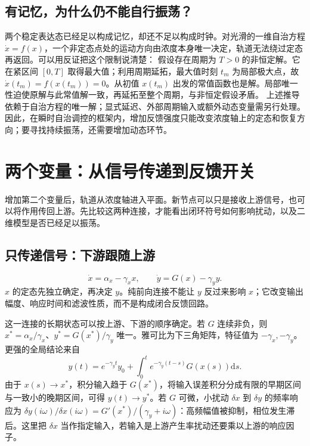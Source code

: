 \documentclass[11pt,a4paper,UTF8,fontset=fandol]{ctexart}
\newcommand{\dd}{\mathrm d}\newcommand{\R}{\mathbb R}\newcommand{\ssv}{\mathrm{ss}}
\begin{document}
\subsection{有记忆，为什么仍不能自行振荡？}
两个稳定表达态已经足以构成记忆，却还不足以构成时钟。对光滑的一维自治方程 $\dot x=f(x)$，一个非定态点处的运动方向由浓度本身唯一决定，轨道无法绕过定态再返回。可以用反证把这个限制说清楚：
假设存在周期为 $T>0$ 的非恒定解。它在紧区间 $[0,T]$ 取得最大值；利用周期延拓，最大值时刻 $t_m$ 为局部极大点，故 $\dot x(t_m)=f(x(t_m))=0$。从初值 $x(t_m)$ 出发的常值函数也是解。局部唯一性迫使原解与此常值解一致，再延拓至整个周期，与非恒定假设矛盾。
上述推导依赖于自治方程的唯一解；显式延迟、外部周期输入或额外动态变量需另行处理。因此，在瞬时自治调控的框架内，增加反馈强度只能改变浓度轴上的定态和恢复方向；要寻找持续振荡，还需要增加动态环节。

\section{两个变量：从信号传递到反馈开关}
增加第二个变量后，轨道从浓度轴进入平面。新节点可以只是接收上游信号，也可以将作用传回上游。先比较这两种连接，才能看出闭环符号如何影响扰动，以及二维模型是否已经足以振荡。
\subsection{只传递信号：下游跟随上游}
\begin{equation}\dot x=\alpha_x-\gamma_xx,\qquad\dot y=G(x)-\gamma_yy.\end{equation}
$x$ 的定态先独立确定，再决定 $y$。纯前向连接不能让 $y$ 反过来影响 $x$；它改变输出幅度、响应时间和滤波性质，而不是构成闭合反馈回路。

这一连接的长期状态可以按上游、下游的顺序确定。若 $G$ 连续非负，则 $x^*=\alpha_x/\gamma_x$、$y^*=G(x^*)/\gamma_y$ 唯一。雅可比为下三角矩阵，特征值为 $-\gamma_x,-\gamma_y$。更强的全局结论来自
\[
y(t)=e^{-\gamma_yt}y_0+\int_0^t e^{-\gamma_y(t-s)}G(x(s))\dd s.
\]
由于 $x(s)\to x^*$，积分输入趋于 $G(x^*)$，将输入误差积分分成有限的早期区间与一致小的晚期区间，可得 $y(t)\to y^*$。若 $G$ 可微，小扰动 $\delta x$ 到 $\delta y$ 的频率响应为
$\delta y(i\omega)/\delta x(i\omega)=G'(x^*)/(\gamma_y+i\omega)$：高频幅值被抑制，相位发生滞后。这里把 $\delta x$ 当作指定输入，若输入是上游产生率扰动还要乘以上游的响应因子。
\end{document}
